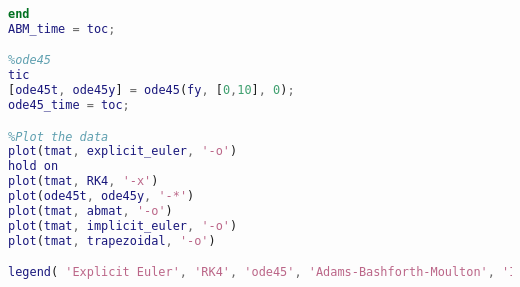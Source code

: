 \documentclass[11pt]{article}
\begin{document}
\begin{lstlisting}[language=Matlab]
end
ABM_time = toc;

%ode45
tic
[ode45t, ode45y] = ode45(fy, [0,10], 0);
ode45_time = toc;

%Plot the data
plot(tmat, explicit_euler, '-o')
hold on
plot(tmat, RK4, '-x')
plot(ode45t, ode45y, '-*')
plot(tmat, abmat, '-o')
plot(tmat, implicit_euler, '-o')
plot(tmat, trapezoidal, '-o')

legend( 'Explicit Euler', 'RK4', 'ode45', 'Adams-Bashforth-Moulton', 'Implicit Euler', 'Trapezoidal')
\end{lstlisting} 
\end{document}
